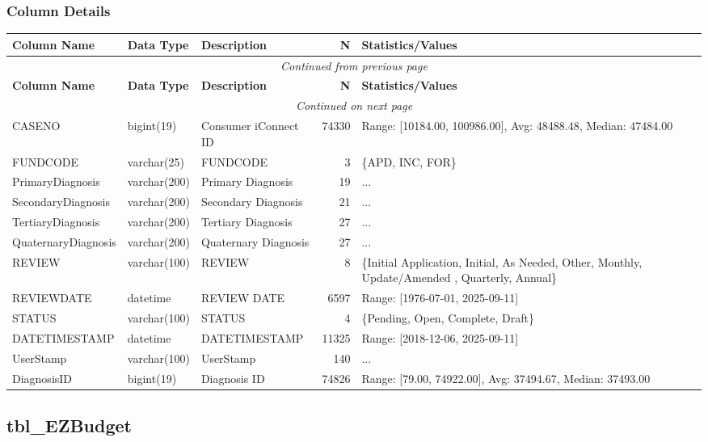 \begin{landscape}
\subsubsection{Column Details}
\begin{longtable}{|l|l|l|r|p{6cm}|}
\hline
\textbf{Column Name} & \textbf{Data Type} & \textbf{Description} & \textbf{N} & \textbf{Statistics/Values} \\
\hline
\endfirsthead
\multicolumn{5}{c}{\textit{Continued from previous page}} \\
\hline
\textbf{Column Name} & \textbf{Data Type} & \textbf{Description} & \textbf{N} & \textbf{Statistics/Values} \\
\hline
\endhead
\hline
\multicolumn{5}{c}{\textit{Continued on next page}} \\
\endfoot
\hline
\endlastfoot
CASENO & bigint(19) & Consumer iConnect ID & 74330 & Range: [10184.00, 100986.00], Avg: 48488.48, Median: 47484.00 \\
\hline
FUNDCODE & varchar(25) & FUNDCODE & 3 & \{APD, INC, FOR\} \\
\hline
PrimaryDiagnosis & varchar(200) & Primary Diagnosis & 19 & ... \\
\hline
SecondaryDiagnosis & varchar(200) & Secondary Diagnosis & 21 & ... \\
\hline
TertiaryDiagnosis & varchar(200) & Tertiary Diagnosis & 27 & ... \\
\hline
QuaternaryDiagnosis & varchar(200) & Quaternary Diagnosis & 27 & ... \\
\hline
REVIEW & varchar(100) & REVIEW & 8 & \{Initial Application, Initial, As Needed, Other, Monthly, Update/Amended , Quarterly, Annual\} \\
\hline
REVIEWDATE & datetime & REVIEW DATE & 6597 & Range: [1976-07-01, 2025-09-11] \\
\hline
STATUS & varchar(100) & STATUS & 4 & \{Pending, Open, Complete, Draft\} \\
\hline
DATETIMESTAMP & datetime & DATETIMESTAMP & 11325 & Range: [2018-12-06, 2025-09-11] \\
\hline
UserStamp & varchar(100) & UserStamp & 140 & ... \\
\hline
DiagnosisID & bigint(19) & Diagnosis ID & 74826 & Range: [79.00, 74922.00], Avg: 37494.67, Median: 37493.00 \\
\hline
\end{longtable}

\subsection{tbl\_EZBudget}


\end{landscape}
